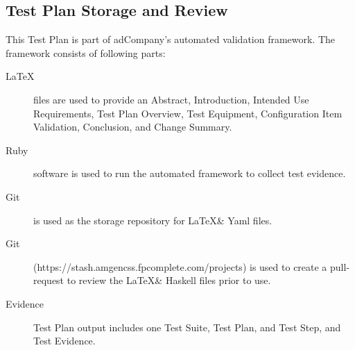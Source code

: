 \subsection{Test Plan Storage and Review}
This Test Plan is part of adCompany's automated validation framework.  The
framework consists of following parts:
\begin{description}
  \item[\LaTeX] files are used to provide an Abstract, Introduction, Intended
    Use Requirements, Test Plan Overview, Test Equipment, Configuration
    Item Validation, Conclusion, and Change Summary.

  \item[Ruby] software is used to run the automated framework to collect test
    evidence.

  \item[Git] is used as the storage repository for \LaTeX \& Yaml files.

  \item[Git] (https://stash.amgencss.fpcomplete.com/projects) is used to
    create a pull-request to review the \LaTeX \& Haskell files prior to use.

  \item[Evidence] Test Plan output includes one Test Suite, Test Plan, and Test
    Step, and Test Evidence.
\end{description}
